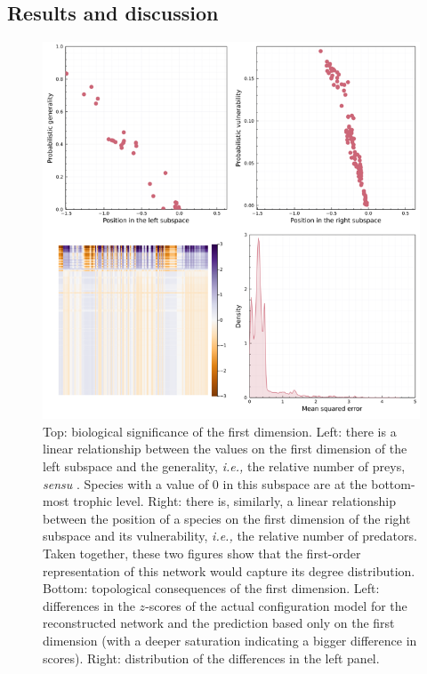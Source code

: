 \begin{refsection}
\section{Results and discussion}\label{results-and-discussion}

\begin{figure}[h]
    \centering
    \includegraphics[width=\textwidth]{figures/figure-degree.png}
    \caption{Top: biological significance of the first dimension. Left:
there is a linear relationship between the values on the first dimension
of the left subspace and the generality, \emph{i.e.,} the relative number
of preys, \emph{sensu} \cite{Schoener1989Food}. Species with a value of 0 in
this subspace are at the bottom-most trophic level. Right: there is,
similarly, a linear relationship between the position of a species on
the first dimension of the right subspace and its vulnerability,
\emph{i.e.,} the relative number of predators. Taken together, these two
figures show that the first-order representation of this network would
capture its degree distribution. Bottom: topological consequences of the
first dimension. Left: differences in the \(z\)-scores of the actual
configuration model for the reconstructed network and the prediction
based only on the first dimension (with a deeper saturation indicating a
bigger difference in scores). Right: distribution of the differences in
the left panel.}
    \label{fig:degree}
\end{figure}


\end{refsection}
